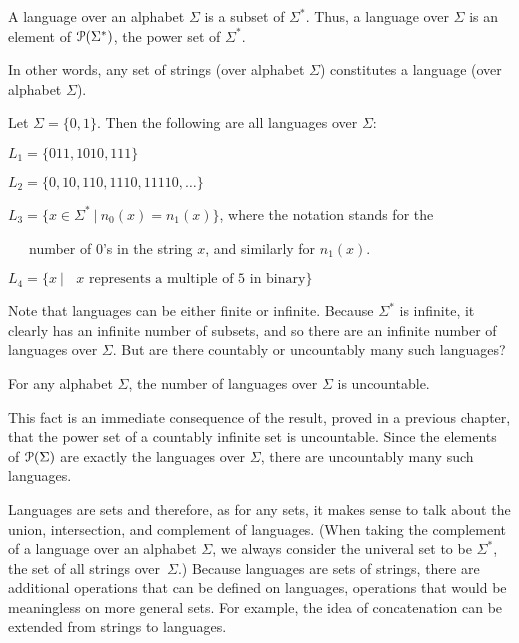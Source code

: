 \begin{definition} A language over an alphabet $\Sigma$ is a subset
of $\Sigma^*$.  Thus, a language over $\Sigma$ is an element of
${\cal P}(\Sigma^*)$, the power set of $\Sigma^*$.
\end{definition}

\smallskip
In other words, any set of strings (over alphabet $\Sigma$) constitutes a
language (over alphabet $\Sigma$).

\smallskip

\begin{example} Let $\Sigma = \{0,1\}$.  Then the following are all
languages over $\Sigma$:

$L_1 = \{011, 1010, 111\}$

$L_2 = \{0, 10, 110, 1110, 11110, \ldots\}$

$L_3 = \{x \in \Sigma^* \ | \ n_0(x) = n_1(x) \}$, where the notation 
stands for the 

\ \ \ number of 0's in the string $x$, and similarly for $n_1(x)$.

$L_4 = \{x \ | \ \mbox{\ $x$ represents a multiple of 5 in binary}\}$
\end{example}

\smallskip

Note that languages can be either finite or infinite.
Because $\Sigma^*$ is infinite, it clearly has an
infinite number of subsets, and so there are an infinite number of languages
over $\Sigma$.  But are there countably or uncountably many such languages?

\smallskip

\begin{theorem}
For any alphabet $\Sigma$, the number of languages over $\Sigma$ is
uncountable.
\end{theorem}

\smallskip
This fact is an immediate consequence of the result, proved in a previous
chapter, that the power set of a countably infinite set is uncountable.  Since
the elements of ${\cal P}(\Sigma)$ are exactly the languages over $\Sigma$,
there are uncountably many such languages.

\medskip

Languages are sets and therefore, as for any sets, it makes sense to talk about
the union, intersection, and complement of languages.  (When taking the complement
of a language over an alphabet $\Sigma$, we always consider the univeral set
to be $\Sigma^*$, the set of all strings over~$\Sigma$.)
Because languages are
sets of strings, there are additional operations that can be defined on
languages, operations that would be meaningless on more general sets.  For
example, the idea of concatenation can be extended from strings to languages.

